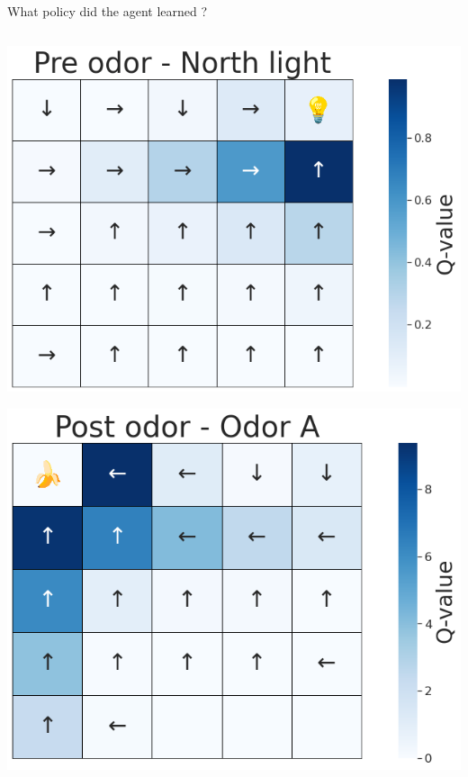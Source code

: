 \documentclass[bigger]{beamer}
\begin{document}
\begin{frame}[label={sec:org1fe4b7e}]{What policy did the agent learned ?}
\addtocounter{framenumber}{-1}
\begin{columns}
\begin{column}[t]{0.5\columnwidth}
\begin{center}
\includegraphics[height=0.4\textheight]{img/policy-allo-north-light.png}
\end{center}
\begin{center}
\includegraphics[height=0.4\textheight]{img/policy-allo-odor-A.png}
\end{center}
\end{column}

\end{columns}
\end{frame}
\end{document}

